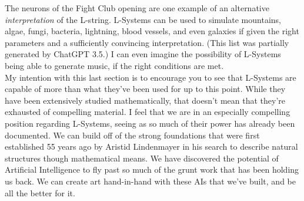 \documentclass[12pt,twoside]{reedthesis}
\begin{document}
	The neurons of the Fight Club opening are one example of an alternative \textit{interpretation} of the L-string. L-Systems can be used to simulate mountains, algae, fungi, bacteria, lightning, blood vessels, and even galaxies if given the right parameters and a sufficiently convincing interpretation. (This list was partially generated by ChatGPT 3.5.) I can even imagine the possibility of L-Systems being able to generate music, if the right conditions are met.\\
	
	My intention with this last section is to encourage you to see that L-Systems are capable of more than what they've been used for up to this point. While they have been extensively studied mathematically, that doesn't mean that they're exhausted of compelling material. I feel that we are in an especially compelling position regarding L-Systems, seeing as so much of their power has already been documented. We can build off of the strong foundations that were first established 55 years ago by Aristid Lindenmayer in his search to describe natural structures though mathematical means. We have discovered the potential of Artificial Intelligence to fly past so much of the grunt work that has been holding us back. We can create art hand-in-hand with these AIs that we've built, and be all the better for it.
	

\end{document}
